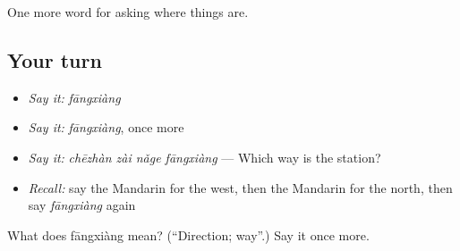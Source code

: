 \begin{grammarlens}[title={What you've built}]
One more word for asking where things are.
\end{grammarlens}

\subsection*{Your turn}
\begin{itemize}
\raggedright
  \item \emph{Say it:} \emph{fāngxiàng}
  \item \emph{Say it:} \emph{fāngxiàng}, once more
  \item \emph{Say it:} \emph{chēzhàn zài nǎge fāngxiàng} — Which way is the station?
  \item \emph{Recall:} say the Mandarin for the west, then the Mandarin for the north, then say \emph{fāngxiàng} again
\end{itemize}

\begin{tcolorbox}[breakable,colback=teal!4,colframe=teal!35!black,title={Before you move on}]
What does fāngxiàng mean? (\textquotedblleft{}Direction; way\textquotedblright{}.) Say it once more.
\end{tcolorbox}
